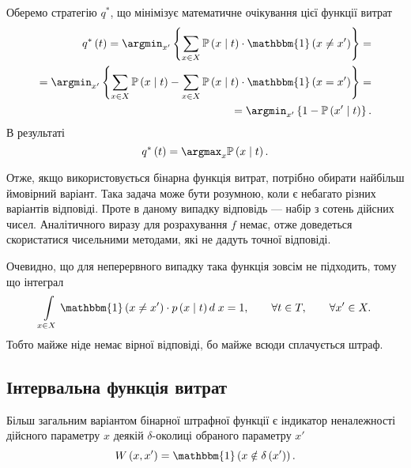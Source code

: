 Оберемо стратегію $q^*$,
що мінімізує математичне очікування цієї функції витрат
\begin{equation*}
  \begin{split}
    q^* \left( t \right)
    = \argmin_{x'} \left\{
      \sum\limits_{x \in X}
        \mathbb{P}\left( x \;\middle|\;  t \right)
        \cdot \mathbbm{1} \left( x \neq x' \right)
      \right\} = \\
    = \argmin_{x'} \left\{
      \sum\limits_{x \in X}
        \mathbb{P}\left( x \;\middle|\;  t \right)
      - \sum\limits_{x \in X}
        \mathbb{P}\left( x \;\middle|\;  t \right)
        \cdot \mathbbm{1} \left( x = x' \right)
      \right\} = \\
    = \argmin_{x'} \left\{
      1 - \mathbb{P}\left( x' \;\middle|\;  t \right)
      \right\}.
  \end{split}
\end{equation*}
В результаті
\begin{equation*}
  q^* \left( t \right)
  = \argmax_x \mathbb{P} \left( x \;\middle|\;  t \right).
\end{equation*}

Отже, якщо використовується бінарна функція витрат,
потрібно обирати найбільш ймовірний варіант.
Така задача може бути розумною, коли є небагато різних варіантів відповіді.
Проте в даному випадку відповідь --- набір з сотень дійсних чисел.
Аналітичного виразу для розрахування $f$ немає,
отже доведеться скористатися чисельними методами,
які не дадуть точної відповіді.

Очевидно,
що для неперервного випадку така функція зовсім не підходить,
тому що інтеграл
\begin{equation*}
  \int\limits_{x \in X} \mathbbm{1} \left( x \neq x' \right)
  \cdot p\left( x \;\middle|\;  t \right) d\; x = 1,\qquad
  \forall t \in T,\qquad
  \forall x' \in X.
\end{equation*}
Тобто майже ніде немає вірної відповіді, бо майже всюди сплачується штраф.

\subsection{Інтервальна функція витрат}

Більш загальним варіантом бінарної штрафної функції є
індикатор неналежності дійсного параметру $x$
деякій $\delta$-околиці обраного параметру $x'$
\begin{equation*}
  W \left( x, x' \right)
  = \mathbbm{1} \left( x \notin \delta\left( x' \right) \right).
\end{equation*}

